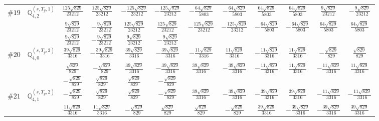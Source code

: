 \documentclass[fleqn,9pt,landscape]{jsarticle}
\begin{document}
\begin{center}
\begin{longtable}{lcccccccccc}
$ \#19\quad \mathbb{Q}_{4,2}^{(s,T_{g},1)} $ & $ \frac{125 \sqrt{829}}{23212} $ & $ \frac{125 \sqrt{829}}{23212} $ & $ - \frac{125 \sqrt{829}}{23212} $ & $ - \frac{125 \sqrt{829}}{23212} $ & $ - \frac{64 \sqrt{829}}{5803} $ & $ - \frac{64 \sqrt{829}}{5803} $ & $ \frac{64 \sqrt{829}}{5803} $ & $ \frac{64 \sqrt{829}}{5803} $ & $ \frac{9 \sqrt{829}}{23212} $ & $ - \frac{9 \sqrt{829}}{23212} $ \\
& $ \frac{9 \sqrt{829}}{23212} $ & $ - \frac{9 \sqrt{829}}{23212} $ & $ \frac{125 \sqrt{829}}{23212} $ & $ \frac{125 \sqrt{829}}{23212} $ & $ - \frac{125 \sqrt{829}}{23212} $ & $ - \frac{125 \sqrt{829}}{23212} $ & $ - \frac{64 \sqrt{829}}{5803} $ & $ - \frac{64 \sqrt{829}}{5803} $ & $ \frac{64 \sqrt{829}}{5803} $ & $ \frac{64 \sqrt{829}}{5803} $ \\
& $ \frac{9 \sqrt{829}}{23212} $ & $ - \frac{9 \sqrt{829}}{23212} $ & $ \frac{9 \sqrt{829}}{23212} $ & $ - \frac{9 \sqrt{829}}{23212} $ & $  $ & $  $ & $  $ & $  $ & $  $ & $  $ \\ \hline
$ \#20\quad \mathbb{Q}_{4,0}^{(s,T_{g},2)} $ & $ \frac{39 \sqrt{829}}{3316} $ & $ - \frac{39 \sqrt{829}}{3316} $ & $ \frac{39 \sqrt{829}}{3316} $ & $ - \frac{39 \sqrt{829}}{3316} $ & $ - \frac{11 \sqrt{829}}{3316} $ & $ \frac{11 \sqrt{829}}{3316} $ & $ - \frac{11 \sqrt{829}}{3316} $ & $ \frac{11 \sqrt{829}}{3316} $ & $ - \frac{\sqrt{829}}{829} $ & $ \frac{\sqrt{829}}{829} $ \\
& $ \frac{\sqrt{829}}{829} $ & $ - \frac{\sqrt{829}}{829} $ & $ \frac{39 \sqrt{829}}{3316} $ & $ - \frac{39 \sqrt{829}}{3316} $ & $ \frac{39 \sqrt{829}}{3316} $ & $ - \frac{39 \sqrt{829}}{3316} $ & $ - \frac{11 \sqrt{829}}{3316} $ & $ \frac{11 \sqrt{829}}{3316} $ & $ - \frac{11 \sqrt{829}}{3316} $ & $ \frac{11 \sqrt{829}}{3316} $ \\
& $ - \frac{\sqrt{829}}{829} $ & $ \frac{\sqrt{829}}{829} $ & $ \frac{\sqrt{829}}{829} $ & $ - \frac{\sqrt{829}}{829} $ & $  $ & $  $ & $  $ & $  $ & $  $ & $  $ \\ \hline
$ \#21\quad \mathbb{Q}_{4,1}^{(s,T_{g},2)} $ & $ - \frac{\sqrt{829}}{829} $ & $ \frac{\sqrt{829}}{829} $ & $ \frac{\sqrt{829}}{829} $ & $ - \frac{\sqrt{829}}{829} $ & $ \frac{39 \sqrt{829}}{3316} $ & $ - \frac{39 \sqrt{829}}{3316} $ & $ - \frac{39 \sqrt{829}}{3316} $ & $ \frac{39 \sqrt{829}}{3316} $ & $ - \frac{11 \sqrt{829}}{3316} $ & $ - \frac{11 \sqrt{829}}{3316} $ \\
& $ \frac{11 \sqrt{829}}{3316} $ & $ \frac{11 \sqrt{829}}{3316} $ & $ - \frac{\sqrt{829}}{829} $ & $ \frac{\sqrt{829}}{829} $ & $ \frac{\sqrt{829}}{829} $ & $ - \frac{\sqrt{829}}{829} $ & $ \frac{39 \sqrt{829}}{3316} $ & $ - \frac{39 \sqrt{829}}{3316} $ & $ - \frac{39 \sqrt{829}}{3316} $ & $ \frac{39 \sqrt{829}}{3316} $ \\

\end{longtable}
\end{center}
\end{document}
